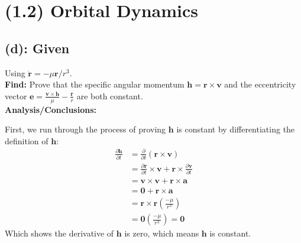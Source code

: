 \documentclass[titlepage]{article}
\begin{document}
\section*{(1.2) Orbital Dynamics}
\subsection*{(d): Given}
Using $\ddot{\boldsymbol{r}}=-\mu\boldsymbol{r}/r^3$.\\

\textbf{Find:}
Prove that the specific angular momentum $\boldsymbol{h}=\boldsymbol{r}\times\boldsymbol{v}$ and the eccentricity vector $\boldsymbol{e}=\frac{\boldsymbol{v}\times\boldsymbol{h}}{\mu}-\frac{\boldsymbol{r}}{r}$ are both constant.\\

\textbf{Analysis/Conclusions:}
\begin{mdframed}[linewidth=1pt, innertopmargin=10pt, innerbottommargin=10pt]
	First, we run through the process of proving $\boldsymbol{h}$ is constant by differentiating the definition of $\boldsymbol{h}$:
	\begin{equation}
		\begin{split}
			\frac{\partial\boldsymbol{h}}{\partial t}&=\frac{\partial}{\partial t}\left(\boldsymbol{r}\times\boldsymbol{v}\right)\\
			&=\frac{\partial\boldsymbol{r}}{\partial t}\times\boldsymbol{v}+\boldsymbol{r}\times\frac{\partial\boldsymbol{v}}{\partial t}\\
			&=\boldsymbol{v}\times\boldsymbol{v}+\boldsymbol{r}\times\boldsymbol{a}\\
			&=\boldsymbol{0}+\boldsymbol{r}\times\boldsymbol{a}\\
			&=\boldsymbol{r}\times\boldsymbol{r}\left(\frac{-\mu}{r^3}\right)\\
			&=\boldsymbol{0}\left(\frac{-\mu}{r^3}\right)=\boldsymbol{0}
		\end{split}
	\end{equation}
	Which shows the derivative of $\boldsymbol{h}$ is zero, which means $\boldsymbol{h}$ is constant.
\end{mdframed}
\end{document}
